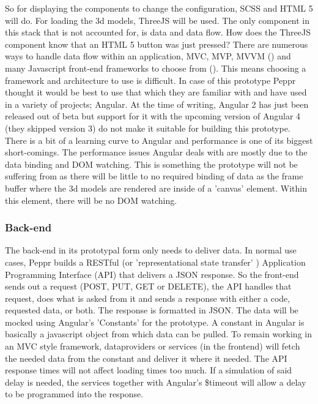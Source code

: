 So for displaying the components to change the configuration, SCSS and HTML 5 will do. For loading the 3d models, ThreeJS will be used. The only component in this stack that is not accounted for, is data and data flow. How does the ThreeJS component know that an HTML 5 button was just pressed? There are numerous ways to handle data flow within an application, MVC, MVP, MVVM (\cite{MVCMVPMVVM}) and many Javascript front-end frameworks to choose from (\cite{javascriptAnno2016}). This means choosing a framework and architecture to use is difficult. In case of this prototype Peppr thought it would be best to use that which they are familiar with and have used in a variety of projects; Angular. At the time of writing, Angular 2 has just been released out of beta but support for it with the upcoming version of Angular 4 (they skipped version 3) do not make it suitable for building this prototype.
There is a bit of a learning curve to Angular and performance is one of its biggest short-comings. The performance issues Angular deals with are mostly due to the data binding and DOM watching. This is something the prototype will not be suffering from as there will be little to no required binding of data as the frame buffer where the 3d models are rendered are inside of a 'canvas' element. Within this element, there will be no DOM watching.

\subsubsection{Back-end}
\label{subsub: backEnd}
The back-end in its prototypal form only needs to deliver data. In normal use cases, Peppr builds a RESTful (or 'representational state transfer' \cite{RESTful} ) Application Programming Interface (API) that delivers a JSON response. So the front-end sends out a request (POST, PUT, GET or DELETE), the API handles that request, does what is asked from it and sends a response with either a code, requested data, or both. The response is formatted in JSON. 
The data will be mocked using Angular's 'Constants' for the prototype. A constant in Angular is basically a javascript object from which data can be pulled. To remain working in an MVC style framework, dataproviders or services (in the frontend) will fetch the needed data from the constant and deliver it where it needed. The API response times will not affect loading times too much. If a simulation of said delay is needed, the services together with Angular's \$timeout will allow a delay to be programmed into the response.

